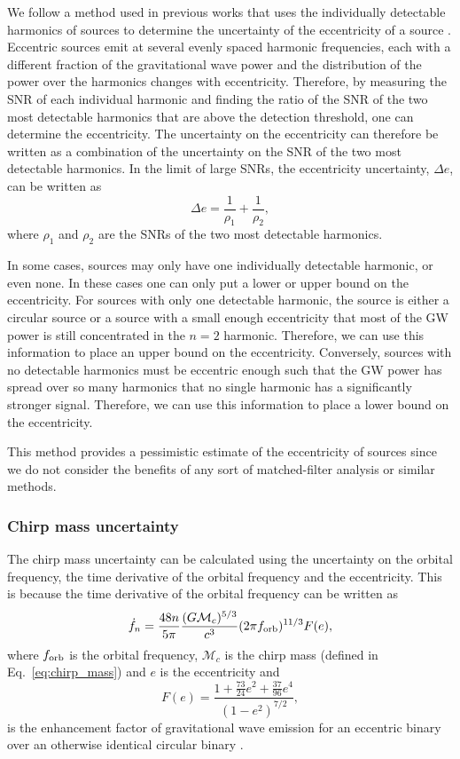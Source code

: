 We follow a method used in previous works that uses the individually detectable harmonics of sources to determine the uncertainty of the eccentricity of a source \citep[e.g.][]{Lau+2020, Korol+2021}. Eccentric sources emit at several evenly spaced harmonic frequencies, each with a different fraction of the gravitational wave power and the distribution of the power over the harmonics changes with eccentricity. Therefore, by measuring the SNR of each individual harmonic and finding the ratio of the SNR of the two most detectable harmonics that are above the detection threshold, one can determine the eccentricity. The uncertainty on the eccentricity can therefore be written as a combination of the uncertainty on the SNR of the two most detectable harmonics. In the limit of large SNRs, the eccentricity uncertainty, $\Delta e$, can be written as 
\begin{equation}
    \Delta e = \frac{1}{\rho_1} + \frac{1}{\rho_2},
\end{equation}
where $\rho_1$ and $\rho_2$ are the SNRs of the two most detectable harmonics.

In some cases, sources may only have one individually detectable harmonic, or even none. In these cases one can only put a lower or upper bound on the eccentricity. For sources with only one detectable harmonic, the source is either a circular source or a source with a small enough eccentricity that most of the GW power is still concentrated in the $n = 2$ harmonic. Therefore, we can use this information to place an upper bound on the eccentricity. Conversely, sources with no detectable harmonics must be eccentric enough such that the GW power has spread over so many harmonics that no single harmonic has a significantly stronger signal. Therefore, we can use this information to place a lower bound on the eccentricity.

This method provides a pessimistic estimate of the eccentricity of sources since we do not consider the benefits of any sort of matched-filter analysis or similar methods.

\subsubsection{Chirp mass uncertainty}
The chirp mass uncertainty can be calculated using the uncertainty on the orbital frequency, the time derivative of the orbital frequency and the eccentricity. This is because the time derivative of the orbital frequency can be written as
\begin{equation}\label{eq:f_n_dot}
    \dot{f}_{n} = \frac{48 n}{5 \pi} \frac{(G \mathcal{M}_c)^{5/3}}{c^3} (2 \pi f_{\rm orb})^{11/3} F(e),
\end{equation}
where $f_{\rm orb}$ is the orbital frequency, $\mathcal{M}_{c}$ is the chirp mass (defined in Eq.~\ref{eq:chirp_mass}) and $e$ is the eccentricity and
\begin{equation}
    F(e) = \frac{1 + \frac{73}{24} e^2 + \frac{37}{96} e^4}{(1 - e^2)^{7/2}},
\end{equation}
is the enhancement factor of gravitational wave emission for an eccentric binary over an otherwise identical circular binary \citep[][Eq.~17]{Peters+1963}.

